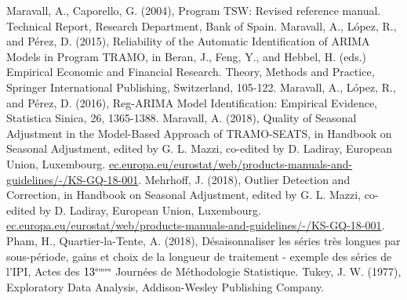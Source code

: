 \documentclass[12pt, a4paper, french]{article}
\begin{document}
\begin{thebibliography}{999}
 Maravall, A., Caporello, G. (2004), Program TSW: Revised reference manual. Technical Report, Research Department, Bank of Spain.
 Maravall, A., L\'{o}pez, R., and P\'{e}rez, D. (2015), Reliability of the Automatic Identification of ARIMA Models in Program TRAMO, in Beran, J., Feng, Y., and Hebbel, H. (eds.) Empirical Economic and Financial Research. Theory, Methods and Practice, Springer International Publishing, Switzerland, 105-122.
 Maravall, A., L\'{o}pez, R., and P\'{e}rez, D. (2016), Reg-ARIMA Model Identification: Empirical Evidence, Statistica Sinica, 26, 1365-1388.
 Maravall, A. (2018), Quality of Seasonal Adjustment in the Model-Based Approach of TRAMO-SEATS, in Handbook on Seasonal Adjustment, edited by G. L. Mazzi, co-edited by D. Ladiray, European Union, Luxembourg. \url{ec.europa.eu/eurostat/web/products-manuals-and-guidelines/-/KS-GQ-18-001}.
 Mehrhoff, J. (2018), Outlier Detection and Correction, in Handbook on Seasonal Adjustment, edited by G. L. Mazzi, co-edited by D. Ladiray, European Union, Luxembourg. \url{ec.europa.eu/eurostat/web/products-manuals-and-guidelines/-/KS-GQ-18-001}.
 Pham, H., Quartier-la-Tente, A. (2018), Désaisonnaliser les séries très longues par sous-période, gains et choix de la longueur de traitement - exemple des séries de l'IPI, Actes des $13^{\mbox{\tiny èmes}}$ Journées de Méthodologie Statistique. 
 Tukey, J. W. (1977), Exploratory Data Analysis, Addison-Wesley Publishing Company.





\end{thebibliography}

%
\end{document}
